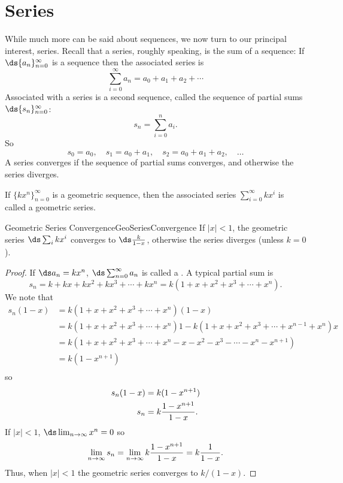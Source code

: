 \section{Series}\label{sec:series}

While much more can be said about sequences, we now turn to our
principal interest, series. Recall that a series, roughly speaking, is
the sum of a sequence: If $\ds\{a_n\}_{n=0}^\infty$ is a sequence then the
associated series is
\[\sum_{i=0}^\infty a_n=a_0+a_1+a_2+\cdots\]
Associated with a series is a second sequence, called the {\dfont sequence of
  partial sums} $\ds\{s_n\}_{n=0}^\infty$:
\[s_n=\sum_{i=0}^n a_i.\]
So
\[s_0=a_0,\quad s_1=a_0+a_1,\quad s_2=a_0+a_1+a_2,\quad \ldots\]
A series converges 
if the sequence of partial sums converges, and otherwise the series 
diverges.

If $\{kx^n\}_{n=0}^{\infty}$ is a geometric sequence, then the associated series $\sum_{i=0}^{\infty}kx^i$ is called a geometric series.

\begin{theorem}{Geometric Series Convergence}{GeoSeriesConvergence}
If $|x|<1$, the geometric series $\ds\sum_i kx^i$ converges to $\ds\frac{k}{1-x}$, otherwise the series diverges (unless $k=0$).
\end{theorem}
\begin{proof}
If $\ds a_n=kx^n$, $\ds\sum_{n=0}^\infty a_n$ is called a 
. A typical partial sum is
\[s_n=k+kx+kx^2+kx^3+\cdots+kx^n=k(1+x+x^2+x^3+\cdots+x^n).\]
We note that
\begin{align*}
  s_n(1-x)&=k(1+x+x^2+x^3+\cdots+x^n)(1-x) \\
  &=k(1+x+x^2+x^3+\cdots+x^n)1-k(1+x+x^2+x^3+\cdots+x^{n-1}+x^n)x \\
  &=k(1+x+x^2+x^3+\cdots+x^n-x-x^2-x^3-\cdots-x^n-x^{n+1}) \\
  &=k(1-x^{n+1}) \\
\end{align*}
so
\begin{align*}
  s_n(1-x)&=k(1-x^{n+1}) \\
  s_n&=k{1-x^{n+1}\over 1-x}. \\
\end{align*}
If $|x|<1$, $\ds\lim_{n\to\infty}x^n=0$ so
\[
  \lim_{n\to\infty}s_n=\lim_{n\to\infty}k{1-x^{n+1}\over 1-x}=
  k{1\over 1-x}.
\]
Thus, when $|x|<1$ the geometric series converges to $k/(1-x)$.
\end{proof}

